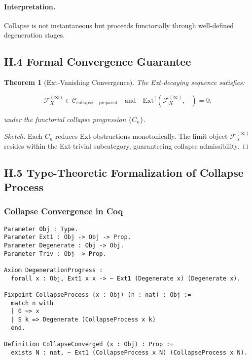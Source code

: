 \documentclass[11pt]{article}
\newtheorem{theorem}{Theorem}[section]
\begin{document}
\paragraph{Interpretation.}
Collapse is not instantaneous but proceeds functorially through well-defined degeneration stages.

\subsection*{H.4 Formal Convergence Guarantee}

\begin{theorem}[Ext-Vanishing Convergence]
The Ext-decaying sequence satisfies:

\[
\mathcal{F}_X^{(\infty)} \in \mathcal{C}_{\mathrm{collapse-prepared}} \quad \text{and} \quad \mathrm{Ext}^1(\mathcal{F}_X^{(\infty)}, -) = 0,
\]

under the functorial collapse progression \( \{ C_n \} \).
\end{theorem}

\begin{proof}[Sketch]
Each \( C_n \) reduces Ext-obstructions monotonically. The limit object \( \mathcal{F}_X^{(\infty)} \) resides within the Ext-trivial subcategory, guaranteeing collapse admissibility.
\end{proof}

\subsection*{H.5 Type-Theoretic Formalization of Collapse Process}

\subsubsection*{Collapse Convergence in Coq}

\begin{lstlisting}[language=Coq, caption=Formal Collapse Process Encoding]
Parameter Obj : Type.
Parameter Ext1 : Obj -> Obj -> Prop.
Parameter Degenerate : Obj -> Obj.
Parameter Triv : Obj -> Prop.

Axiom DegenerationProgress :
  forall x : Obj, Ext1 x x -> ~ Ext1 (Degenerate x) (Degenerate x).

Fixpoint CollapseProcess (x : Obj) (n : nat) : Obj :=
  match n with
  | 0 => x
  | S k => Degenerate (CollapseProcess x k)
  end.

Definition CollapseConverged (x : Obj) : Prop :=
  exists N : nat, ~ Ext1 (CollapseProcess x N) (CollapseProcess x N).
\end{lstlisting}
\end{document}

